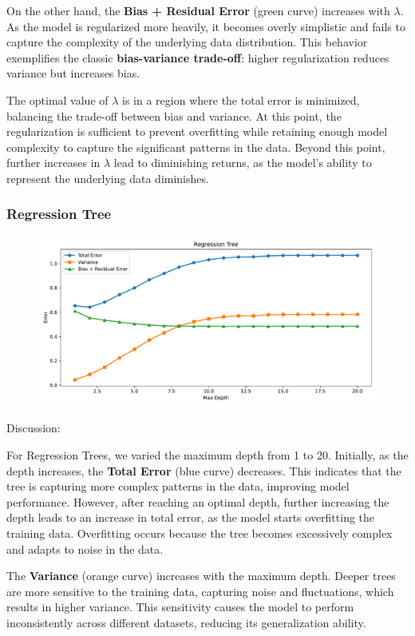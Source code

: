 \documentclass[a4paper,10pt]{article}
\begin{document}
On the other hand, the \textbf{Bias + Residual Error} (green curve) increases with \(\lambda\). As the model is regularized more heavily, it becomes overly simplistic and fails to capture the complexity of the underlying data distribution. This behavior exemplifies the classic \textbf{bias-variance trade-off}: higher regularization reduces variance but increases bias.

The optimal value of \(\lambda\) is in a region where the total error is minimized, balancing the trade-off between bias and variance. At this point, the regularization is sufficient to prevent overfitting while retaining enough model complexity to capture the significant patterns in the data. Beyond this point, further increases in \(\lambda\) lead to diminishing returns, as the model’s ability to represent the underlying data diminishes.


\subsubsection{Regression Tree}

\begin{figure}[H]
    \centering
    \includegraphics[width=0.8\linewidth]{images/2.3_rt.pdf}
\end{figure}

Discussion:

For Regression Trees, we varied the maximum depth from 1 to 20. Initially, as the depth increases, the \textbf{Total Error} (blue curve) decreases. This indicates that the tree is capturing more complex patterns in the data, improving model performance. However, after reaching an optimal depth, further increasing the depth leads to an increase in total error, as the model starts overfitting the training data. Overfitting occurs because the tree becomes excessively complex and adapts to noise in the data.

The \textbf{Variance} (orange curve) increases with the maximum depth. Deeper trees are more sensitive to the training data, capturing noise and fluctuations, which results in higher variance. This sensitivity causes the model to perform inconsistently across different datasets, reducing its generalization ability.
\end{document}
